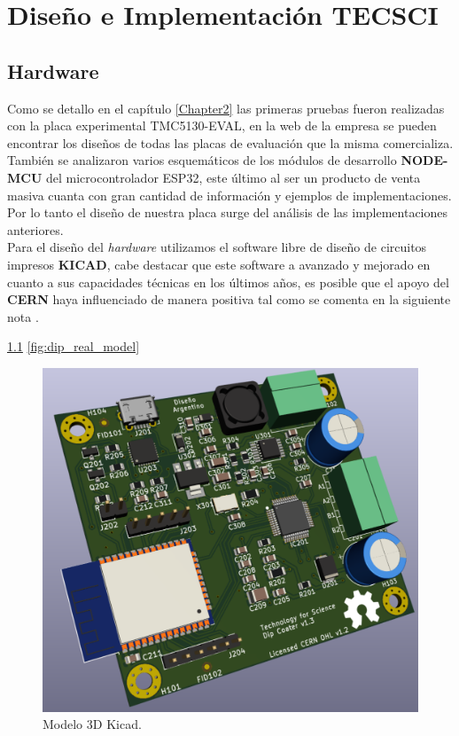 
\chapter{Diseño e Implementación TECSCI} %

\label{Chapter3} %

\section{Hardware}

Como se detallo en el capítulo \ref{Chapter2} las primeras pruebas fueron realizadas con la placa experimental TMC5130-EVAL, en la web de la empresa \citep{3_web_trinamic} se pueden encontrar los diseños de todas las placas de evaluación que la misma comercializa. También se analizaron varios esquemáticos de los módulos de desarrollo \textbf{NODE-MCU} del microcontrolador ESP32, este último al ser un producto de venta masiva cuanta con gran cantidad de información y ejemplos de implementaciones. Por lo tanto el diseño de nuestra placa surge del análisis de las implementaciones anteriores.
\\
Para el diseño del \textit{hardware} utilizamos el software libre de diseño de circuitos impresos \textbf{KICAD}, cabe destacar que este software a avanzado y mejorado en cuanto a sus capacidades técnicas en los últimos años, es posible que el apoyo del \textbf{CERN} haya influenciado de manera positiva tal como se comenta en la siguiente nota \citep{1_nota_web_kicad_cern}.

\ref{fig:dip_3d_model}
\ref{fig:dip_real_model}

\begin{figure}[htbp]
	\centering
	\includegraphics[width=.5\textwidth]{./Figures/dip_3d_model.pdf}
	\caption{Modelo 3D Kicad.}
	\label{fig:dip_3d_model}
\end{figure}
         


